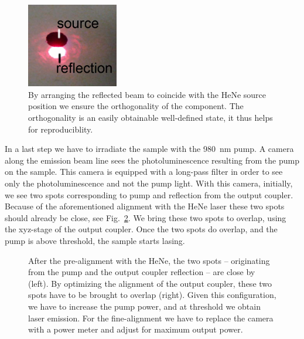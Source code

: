 \begin{figure}
\centering
\includegraphics[width=4cm]{img/HeNe.jpg}
\caption{By arranging the reflected beam to coincide with the HeNe source position
we ensure the orthogonality of the component.
The orthogonality is an easily obtainable well-defined state,
it thus helps for reproduciblity.}
\label{img:HeNe}
\end{figure}

In a last step we have to irradiate the sample with the 980~nm pump.
A camera along the emission beam line
sees the photoluminescence resulting from the pump on the sample.
This camera is equipped with a long-pass filter
in order to see only the photoluminescence
and not the pump light.
With this camera,
initially,
we see two spots corresponding to
pump and reflection from the output coupler.
Because of the aforementioned alignment with the HeNe laser
these two spots should already be close,
see Fig.~\ref{img:spot_overlap}.
We bring these two spots to overlap,
using the xyz-stage of the output coupler.
Once the two spots do overlap,
and the pump is above threshold,
the sample starts lasing.

\begin{figure}
\centering
{}
\caption{After the pre-alignment
with the HeNe,
the two spots --
originating
from the pump
and the output coupler reflection --
are close by (left).
By optimizing the alignment
of the output coupler,
these two spots
have to be brought to overlap (right).
Given this configuration,
we have to increase the pump power,
and at threshold we obtain laser emission.
For the fine-alignment
we have to replace the camera
with a power meter
and adjust for maximum output power.}
\label{img:spot_overlap}
\end{figure}

